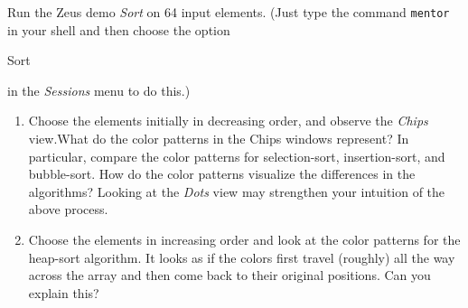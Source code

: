 Run the Zeus demo {\em Sort} on 64 input elements. (Just type the
command {\tt mentor} in your shell and then choose the option {\em

  Sort} in the {\em Sessions} menu to do this.)

\begin{enumerate}
\item  Choose the elements initially in decreasing order, and observe
  the {\em Chips} view.What do the color patterns in the Chips windows
  represent?  In particular, compare the color patterns for
  selection-sort, insertion-sort, and bubble-sort.  How do the color
  patterns visualize the differences in the algorithms? Looking at the
  {\em Dots} view may strengthen your intuition of the above process.
  
\item  Choose the elements in increasing order and look at the color
  patterns for the heap-sort algorithm. It looks as if the colors
  first travel (roughly) all the way across the array and then come
  back to their original positions. Can you explain this?
\end{enumerate}
 
